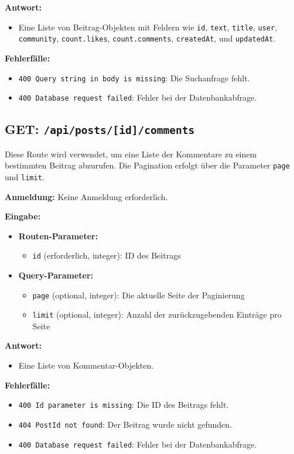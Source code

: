 \documentclass[a4paper,12pt]{article}
\begin{document}
\textbf{Antwort:}
\begin{itemize}
    \item Eine Liste von Beitrag-Objekten mit Feldern wie \texttt{id}, \texttt{text}, \texttt{title}, \texttt{user}, \texttt{community}, \texttt{count.likes}, \texttt{count.comments}, \texttt{createdAt}, und \texttt{updatedAt}.
\end{itemize}

\textbf{Fehlerfälle:}
\begin{itemize}
    \item \texttt{400 Query string in body is missing}: Die Suchanfrage fehlt.
    \item \texttt{400 Database request failed}: Fehler bei der Datenbankabfrage.
\end{itemize}

\newpage
\subsection{GET: \texttt{/api/posts/[id]/comments}}

Diese Route wird verwendet, um eine Liste der Kommentare zu einem bestimmten Beitrag abzurufen. Die Pagination erfolgt über die Parameter \texttt{page} und \texttt{limit}.

\textbf{Anmeldung:} Keine Anmeldung erforderlich.

\textbf{Eingabe:}
\begin{itemize}
    \item \textbf{Routen-Parameter:}
    \begin{itemize}
        \item \texttt{id} (erforderlich, integer): ID des Beitrags
    \end{itemize}
    \item \textbf{Query-Parameter:}
    \begin{itemize}
        \item \texttt{page} (optional, integer): Die aktuelle Seite der Paginierung
        \item \texttt{limit} (optional, integer): Anzahl der zurückzugebenden Einträge pro Seite
    \end{itemize}
\end{itemize}

\textbf{Antwort:}
\begin{itemize}
    \item Eine Liste von Kommentar-Objekten.
\end{itemize}

\textbf{Fehlerfälle:}
\begin{itemize}
    \item \texttt{400 Id parameter is missing}: Die ID des Beitrags fehlt.
    \item \texttt{404 PostId not found}: Der Beitrag wurde nicht gefunden.
    \item \texttt{400 Database request failed}: Fehler bei der Datenbankabfrage.
\end{itemize}
\end{document}
